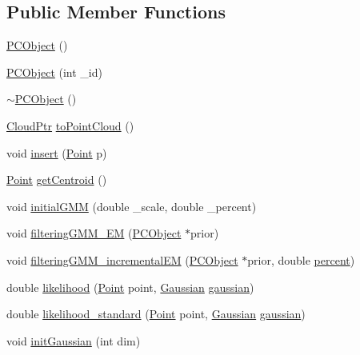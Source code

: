 \subsection*{\-Public \-Member \-Functions}
\begin{DoxyCompactItemize}
\item 
\hyperlink{class_p_c_object_aad6caa1808cb593e46ff8cbf87c3a29a}{\-P\-C\-Object} ()
\item 
\hyperlink{class_p_c_object_ab5af2877120e54f89d4c4212b2285488}{\-P\-C\-Object} (int \-\_\-id)
\item 
\hyperlink{class_p_c_object_a51c8555367f90194d4c5cbfcd589e812}{$\sim$\-P\-C\-Object} ()
\item 
\hyperlink{common_8h_a36884aa4a3c181fa4c284d79329ad166}{\-Cloud\-Ptr} \hyperlink{class_p_c_object_ae1207c2fc7b1c91274287622c879e56a}{to\-Point\-Cloud} ()
\item 
void \hyperlink{class_p_c_object_ac8872c933f6ebf08abfd1aa4ebde6ebd}{insert} (\hyperlink{class_point}{\-Point} p)
\item 
\hyperlink{class_point}{\-Point} \hyperlink{class_p_c_object_a45a4d281641c441467c976bc390379af}{get\-Centroid} ()
\item 
void \hyperlink{class_p_c_object_a60989cacede56624284ad05f74df9c2a}{initial\-G\-M\-M} (double \-\_\-scale, double \-\_\-percent)
\item 
void \hyperlink{class_p_c_object_a20b15832e2475a1a14e47763a4960109}{filtering\-G\-M\-M\-\_\-\-E\-M} (\hyperlink{class_p_c_object}{\-P\-C\-Object} $\ast$prior)
\item 
void \hyperlink{class_p_c_object_ad85cb4f948c94eb35117fffe54b8d688}{filtering\-G\-M\-M\-\_\-incremental\-E\-M} (\hyperlink{class_p_c_object}{\-P\-C\-Object} $\ast$prior, double \hyperlink{class_p_c_object_a4ac23bed170d9a2993524e4b742c99a4}{percent})
\item 
double \hyperlink{class_p_c_object_a11cc868dc9f8712917148437dc026c57}{likelihood} (\hyperlink{class_point}{\-Point} point, \hyperlink{class_gaussian}{\-Gaussian} \hyperlink{class_p_c_object_a2a0a0fe603bac2c80a43d4f6e224bf98}{gaussian})
\item 
double \hyperlink{class_p_c_object_a2b88860d97b5c8f7b784427ce5a6f5b4}{likelihood\-\_\-standard} (\hyperlink{class_point}{\-Point} point, \hyperlink{class_gaussian}{\-Gaussian} \hyperlink{class_p_c_object_a2a0a0fe603bac2c80a43d4f6e224bf98}{gaussian})
\item 
void \hyperlink{class_p_c_object_adcf48887575738fff69b7e765529520a}{init\-Gaussian} (int dim)
\item 

\end{DoxyCompactItemize}
